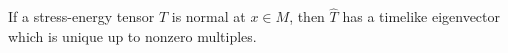 If a stress-energy tensor $\hat{T}$ is normal at $x \in M$, then $\hat{T}$ has a timelike eigenvector which is unique up to nonzero multiples.
